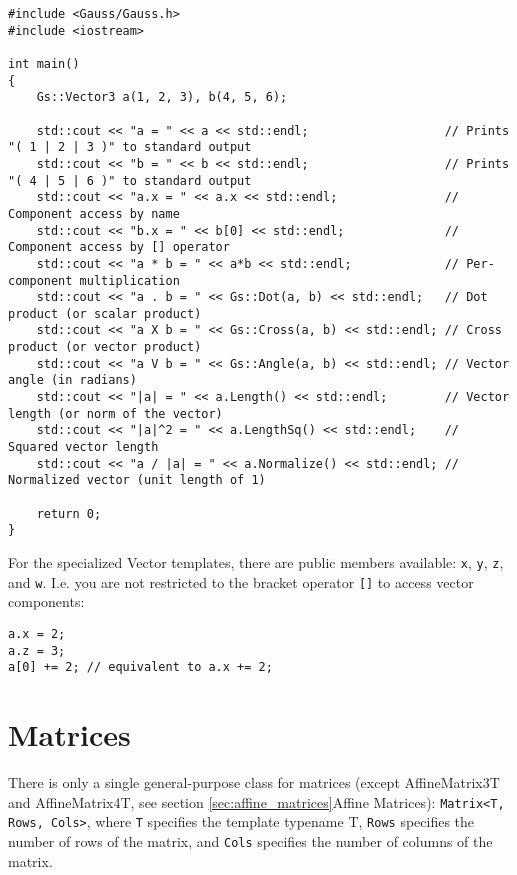\documentclass{article}
\begin{document}
\begin{lstlisting}
#include <Gauss/Gauss.h>
#include <iostream>

int main()
{
	Gs::Vector3 a(1, 2, 3), b(4, 5, 6);
	
	std::cout << "a = " << a << std::endl;                   // Prints "( 1 | 2 | 3 )" to standard output
	std::cout << "b = " << b << std::endl;                   // Prints "( 4 | 5 | 6 )" to standard output
	std::cout << "a.x = " << a.x << std::endl;               // Component access by name
	std::cout << "b.x = " << b[0] << std::endl;              // Component access by [] operator
	std::cout << "a * b = " << a*b << std::endl;             // Per-component multiplication
	std::cout << "a . b = " << Gs::Dot(a, b) << std::endl;   // Dot product (or scalar product)
	std::cout << "a X b = " << Gs::Cross(a, b) << std::endl; // Cross product (or vector product)
	std::cout << "a V b = " << Gs::Angle(a, b) << std::endl; // Vector angle (in radians)
	std::cout << "|a| = " << a.Length() << std::endl;        // Vector length (or norm of the vector)
	std::cout << "|a|^2 = " << a.LengthSq() << std::endl;    // Squared vector length
	std::cout << "a / |a| = " << a.Normalize() << std::endl; // Normalized vector (unit length of 1)
	
	return 0;
}
\end{lstlisting}
For the specialized Vector templates, there are public members available: \texttt{x}, \texttt{y}, \texttt{z}, and \texttt{w}.
I.e. you are not restricted to the bracket operator \texttt{[]} to access vector components:
\begin{lstlisting}
a.x = 2;
a.z = 3;
a[0] += 2; // equivalent to a.x += 2;
\end{lstlisting}



\newpage

\section*{Matrices}

There is only a single general-purpose class for matrices
(except AffineMatrix3T and AffineMatrix4T, see section \ref{sec:affine_matrices}{Affine Matrices}):
\texttt{Matrix<T, Rows, Cols>}, where \texttt{T} specifies the template typename T, \texttt{Rows} specifies the
number of rows of the matrix, and \texttt{Cols} specifies the number of columns of the matrix.
\end{document}
